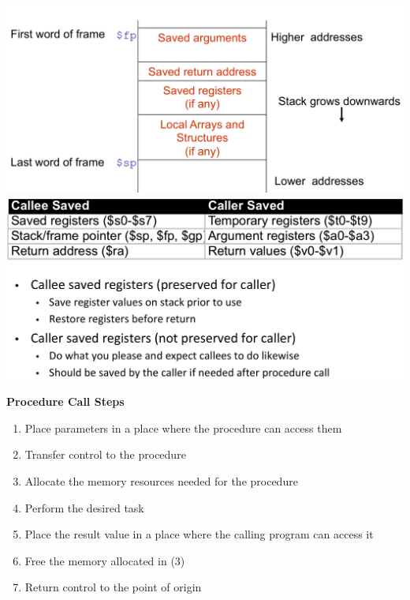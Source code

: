 \includegraphics[width=\linewidth]{png/stack.png}
\includegraphics[width=\linewidth]{png/save.png}

\textbf{Procedure Call Steps}
\begin{enumerate}
\item Place parameters in a place where the procedure can access them
\item Transfer control to the procedure
\item Allocate the memory resources needed for the procedure
\item Perform the desired task
\item Place the result value in a place where the calling program can access it
\item Free the memory allocated in (3)
\item Return control to the point of origin
\end{enumerate}
